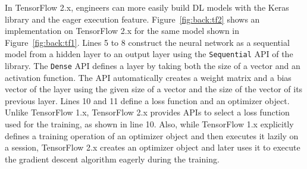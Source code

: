In TensorFlow 2.x, engineers can more easily build DL models with the Keras
library and the eager execution feature.
Figure~\ref{fig:back:tf2} shows an implementation on TensorFlow 2.x for the
same model shown in Figure~\ref{fig:back:tf1}.
Lines 5 to 8 construct the neural network as a sequential model from a
hidden layer to an output layer using the {\tt Sequential} API of the
library.
The {\tt Dense} API defines a layer by taking both the size of a vector and an
activation function. 
The API automatically creates a weight matrix and a bias vector of the layer
using the given size of a vector and the size of the vector of its previous
layer.
Lines 10 and 11 define a loss function and an optimizer object.  
Unlike TensorFlow 1.x, TensorFlow 2.x provides APIs to select a loss function
used for the training, as shown in line 10.
Also, while TensorFlow 1.x explicitly defines a training operation of an
optimizer object and then executes it lazily on a session, TensorFlow 2.x
creates an optimizer object and later uses it to execute the
gradient descent algorithm eagerly during the training.
